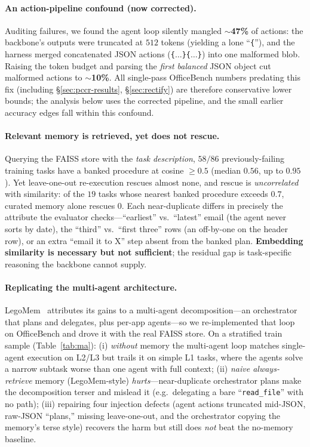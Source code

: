 \documentclass[10pt,twocolumn]{article}
\begin{document}
\paragraph{An action-pipeline confound (now corrected).} Auditing failures, we found the
agent loop silently mangled $\sim$\textbf{47\%} of actions: the backbone's outputs were
truncated at $512$ tokens (yielding a lone ``\texttt{\{}''), and the harness merged
concatenated JSON actions (\texttt{\{$\dots$\}\{$\dots$\}}) into one malformed blob.
Raising the token budget and parsing the \emph{first balanced} JSON object cut malformed
actions to $\sim$\textbf{10\%}. All single-pass OfficeBench numbers predating this fix
(including \S\ref{sec:pccr-results}, \S\ref{sec:rectify}) are therefore conservative
lower bounds; the analysis below uses the corrected pipeline, and the small earlier
accuracy edges fall within this confound.

\paragraph{Relevant memory is retrieved, yet does not rescue.} Querying the FAISS store
with the \emph{task description}, $58/86$ previously-failing training tasks have a banked
procedure at cosine $\ge 0.5$ (median $0.56$, up to $0.95$). Yet leave-one-out
re-execution rescues almost none, and rescue is \emph{uncorrelated} with similarity: of
the $19$ tasks whose nearest banked procedure exceeds $0.7$, curated memory alone rescues
$0$. Each near-duplicate differs in precisely the attribute the evaluator checks---``earliest''
vs.\ ``latest'' email (the agent never sorts by date), the ``third'' vs.\ ``first three''
rows (an off-by-one on the header row), or an extra ``email it to X'' step absent from the
banked plan. \textbf{Embedding similarity is necessary but not sufficient}; the residual
gap is task-specific reasoning the backbone cannot supply.

\paragraph{Replicating the multi-agent architecture.} LegoMem~\cite{legomem} attributes
its gains to a multi-agent decomposition---an orchestrator that plans and delegates, plus
per-app agents---so we re-implemented that loop on OfficeBench and drove it with the real
FAISS store. On a stratified train sample (Table~\ref{tab:ma}): (i) \emph{without} memory
the multi-agent loop matches single-agent execution on L2/L3 but trails it on simple L1
tasks, where the agents solve a narrow subtask worse than one agent with full context;
(ii) \emph{naive always-retrieve} memory (LegoMem-style) \emph{hurts}---near-duplicate
orchestrator plans make the decomposition terser and mislead it (e.g.\ delegating a bare
``\texttt{read\_file}'' with no path); (iii) repairing four injection defects (agent
actions truncated mid-JSON, raw-JSON ``plans,'' missing leave-one-out, and the
orchestrator copying the memory's terse style) recovers the harm but still does
\emph{not} beat the no-memory baseline.
\end{document}
